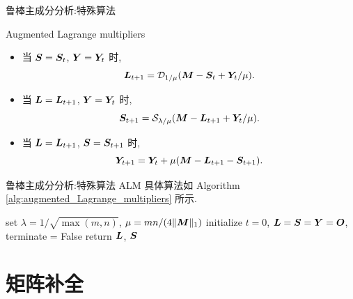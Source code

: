 \documentclass{beamer}
\begin{document}
\begin{frame}{鲁棒主成分分析:特殊算法}
  \begin{block}{Augmented Lagrange multipliers}
    \begin{itemize}
      \item 当 $\bm{S}=\bm{S}_{t}$, $\bm{Y}=\bm{Y}_t$ 时,
      \begin{equation}
        \bm{L}_{t+1}
        =\mathcal{D}_{1/\mu}(\bm{M}-\bm{S}_t+\bm{Y}_t/\mu).
      \end{equation}
      \item 当 $\bm{L}=\bm{L}_{t+1}$, $\bm{Y}=\bm{Y}_t$ 时,
      \begin{equation}
        \bm{S}_{t+1}
        =\mathcal{S}_{\lambda/\mu}(\bm{M}-\bm{L}_{t+1}+\bm{Y}_t/\mu).
      \end{equation}
      \item 当 $\bm{L}=\bm{L}_{t+1}$, $\bm{S}=\bm{S}_{t+1}$ 时,
      \begin{equation}
        \bm{Y}_{t+1}
        =\bm{Y}_t+\mu(\bm{M}-\bm{L}_{t+1}-\bm{S}_{t+1}).
      \end{equation}
    \end{itemize}
  \end{block}
\end{frame}

\begin{frame}{鲁棒主成分分析:特殊算法}
  ALM 具体算法如 Algorithm \ref{alg:augmented_Lagrange_multipliers} 所示.

  \begin{algorithm}[H]
    \small
    \label{alg:augmented_Lagrange_multipliers}
    \caption{Augmented Lagrange multipliers for RPCA.}
    set $\lambda=1/\sqrt{\max(m,n)}$, $\mu=mn/(4\|\bm{M}\|_1)$\;
    initialize $t=0$, $\bm{L}=\bm{S}=\bm{Y}=\bm{O}$, terminate = False\;
    return $\bm{L}$, $\bm{S}$\;
  \end{algorithm}
\end{frame}

\section{矩阵补全}
\end{document}
